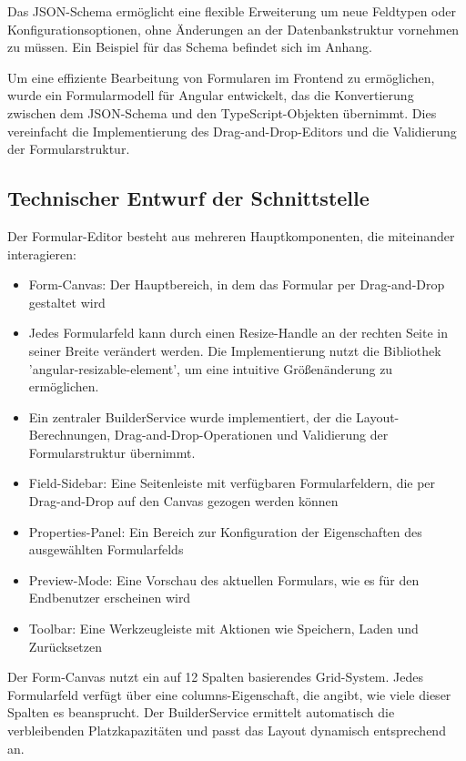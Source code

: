 \documentclass[a4paper,11pt]{article}
\begin{document}
\noindent Das JSON-Schema ermöglicht eine flexible Erweiterung um neue Feldtypen oder Konfigurationsoptionen, ohne Änderungen an der Datenbankstruktur vornehmen zu müssen. Ein Beispiel für das Schema befindet sich im Anhang.

\noindent Um eine effiziente Bearbeitung von Formularen im Frontend zu ermöglichen, wurde ein Formularmodell für Angular entwickelt, das die Konvertierung zwischen dem JSON-Schema und den TypeScript-Objekten übernimmt. Dies vereinfacht die Implementierung des Drag-and-Drop-Editors und die Validierung der Formularstruktur.


\subsection{Technischer Entwurf der Schnittstelle}
Der Formular-Editor besteht aus mehreren Hauptkomponenten, die miteinander interagieren:

\begin{itemize}
  \item Form-Canvas: Der Hauptbereich, in dem das Formular per Drag-and-Drop gestaltet wird
  \item Jedes Formularfeld kann durch einen Resize-Handle an der rechten Seite in seiner Breite verändert werden. Die Implementierung nutzt die Bibliothek 'angular-resizable-element', um eine intuitive Größenänderung zu ermöglichen.
  \item Ein zentraler BuilderService wurde implementiert, der die Layout-Berechnungen, Drag-and-Drop-Operationen und Validierung der Formularstruktur übernimmt.
  \item Field-Sidebar: Eine Seitenleiste mit verfügbaren Formularfeldern, die per Drag-and-Drop auf den Canvas gezogen werden können
  \item Properties-Panel: Ein Bereich zur Konfiguration der Eigenschaften des ausgewählten Formularfelds
  \item Preview-Mode: Eine Vorschau des aktuellen Formulars, wie es für den Endbenutzer erscheinen wird
  \item Toolbar: Eine Werkzeugleiste mit Aktionen wie Speichern, Laden und Zurücksetzen
\end{itemize}

\noindent Der Form-Canvas nutzt ein auf 12 Spalten basierendes Grid-System. Jedes Formularfeld verfügt über eine columns-Eigenschaft, die angibt, wie viele dieser Spalten es beansprucht. Der BuilderService ermittelt automatisch die verbleibenden Platzkapazitäten und passt das Layout dynamisch entsprechend an.
\end{document}
